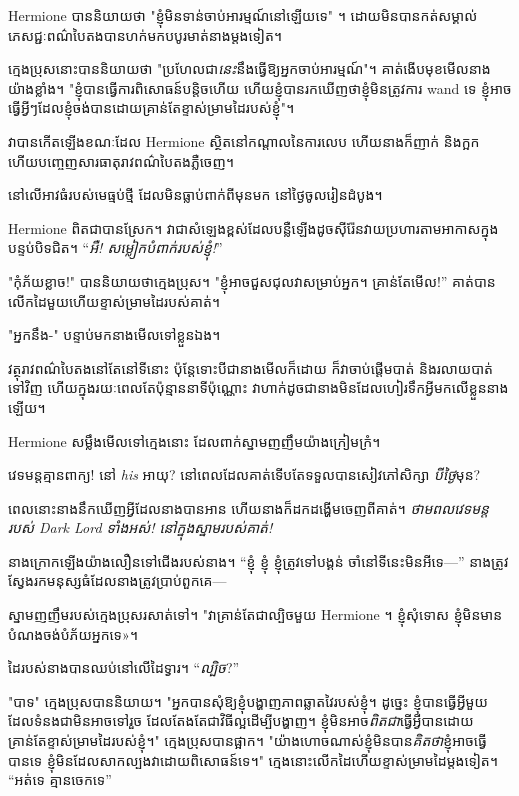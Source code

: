 Hermione បាននិយាយថា "ខ្ញុំមិនទាន់ចាប់អារម្មណ៍នៅឡើយទេ" ។ ដោយ​មិន​បាន​កត់​សម្គាល់ ភេសជ្ជៈ​ពណ៌​បៃតង​បាន​ហក់​មក​បបូរមាត់​នាង​ម្ដង​ទៀត។

ក្មេងប្រុសនោះបាននិយាយថា "ប្រហែលជា\emph{នេះ}នឹងធ្វើឱ្យអ្នកចាប់អារម្មណ៍"។ គាត់​ងើប​មុខ​មើល​នាង​យ៉ាង​ខ្លាំង។ "ខ្ញុំបានធ្វើការពិសោធន៍បន្តិចហើយ ហើយខ្ញុំបានរកឃើញថាខ្ញុំមិនត្រូវការ wand ទេ ខ្ញុំអាចធ្វើអ្វីៗដែលខ្ញុំចង់បានដោយគ្រាន់តែខ្ទាស់ម្រាមដៃរបស់ខ្ញុំ"។

វាបានកើតឡើងខណៈដែល Hermione ស្ថិតនៅកណ្តាលនៃការលេប ហើយនាងក៏ញាក់ និងក្អក ហើយបញ្ចេញសារធាតុរាវពណ៌បៃតងភ្លឺចេញ។

នៅលើអាវធំរបស់មេធ្មប់ថ្មី ដែលមិនធ្លាប់ពាក់ពីមុនមក នៅថ្ងៃចូលរៀនដំបូង។

Hermione ពិតជាបានស្រែក។ វា​ជា​សំឡេង​ខ្ពស់​ដែល​បន្លឺ​ឡើង​ដូច​ស៊ីរ៉ែន​វាយ​ប្រហារ​តាម​អាកាស​ក្នុង​បន្ទប់​បិទ​ជិត។ “\emph{អឺ! សម្លៀកបំពាក់របស់ខ្ញុំ!}”

"កុំភ័យខ្លាច!" បាននិយាយថាក្មេងប្រុស។ "ខ្ញុំអាចជួសជុលវាសម្រាប់អ្នក។ គ្រាន់តែមើល!” គាត់បានលើកដៃមួយហើយខ្ទាស់ម្រាមដៃរបស់គាត់។

"អ្នកនឹង-" បន្ទាប់មកនាងមើលទៅខ្លួនឯង។

វត្ថុរាវពណ៌បៃតងនៅតែនៅទីនោះ ប៉ុន្តែទោះបីជានាងមើលក៏ដោយ ក៏វាចាប់ផ្តើមបាត់ និងរលាយបាត់ទៅវិញ ហើយក្នុងរយៈពេលតែប៉ុន្មាននាទីប៉ុណ្ណោះ វាហាក់ដូចជានាងមិនដែលហៀរទឹកអ្វីមកលើខ្លួននាងឡើយ។

Hermione សម្លឹងមើលទៅក្មេងនោះ ដែលពាក់ស្នាមញញឹមយ៉ាងក្រៀមក្រំ។

វេទមន្តគ្មានពាក្យ! នៅ \emph{his} អាយុ? នៅពេលដែលគាត់ទើបតែទទួលបានសៀវភៅសិក្សា \emph{បីថ្ងៃ}មុន?

ពេល​នោះ​នាង​នឹក​ឃើញ​អ្វី​ដែល​នាង​បាន​អាន ហើយ​នាង​ក៏​ដក​ដង្ហើម​ចេញ​ពី​គាត់។ \emph{ថាមពលវេទមន្តរបស់ Dark Lord ទាំងអស់! នៅក្នុងស្នាមរបស់គាត់!}

នាងក្រោកឡើងយ៉ាងលឿនទៅជើងរបស់នាង។ “ខ្ញុំ ខ្ញុំ ខ្ញុំត្រូវទៅបង្គន់ ចាំនៅទីនេះមិនអីទេ—” នាងត្រូវស្វែងរកមនុស្សធំដែលនាងត្រូវប្រាប់ពួកគេ—

ស្នាមញញឹមរបស់ក្មេងប្រុសរសាត់ទៅ។ "វាគ្រាន់តែជាល្បិចមួយ Hermione ។ ខ្ញុំសុំទោស ខ្ញុំមិនមានបំណងចង់បំភ័យអ្នកទេ»។

ដៃរបស់នាងបានឈប់នៅលើដៃទ្វារ។ “\emph{ល្បិច}?”

"បាទ" ក្មេងប្រុសបាននិយាយ។ "អ្នកបានសុំឱ្យខ្ញុំបង្ហាញភាពឆ្លាតវៃរបស់ខ្ញុំ។ ដូច្នេះ ខ្ញុំ​បាន​ធ្វើ​អ្វី​មួយ​ដែល​ទំនង​ជា​មិន​អាច​ទៅ​រួច ដែល​តែងតែ​ជា​វិធី​ល្អ​ដើម្បី​បង្ហាញ។ ខ្ញុំមិនអាច\emph{ពិតជា}ធ្វើអ្វីបានដោយគ្រាន់តែខ្ទាស់ម្រាមដៃរបស់ខ្ញុំ។" ក្មេងប្រុសបានផ្អាក។ "យ៉ាងហោចណាស់ខ្ញុំមិនបាន\emph{គិតថា}ខ្ញុំអាចធ្វើបានទេ ខ្ញុំមិនដែលសាកល្បងវាដោយពិសោធន៍ទេ។" ក្មេង​នោះ​លើក​ដៃ​ហើយ​ខ្ទាស់​ម្រាម​ដៃ​ម្ដង​ទៀត។ “អត់ទេ គ្មានចេកទេ”

